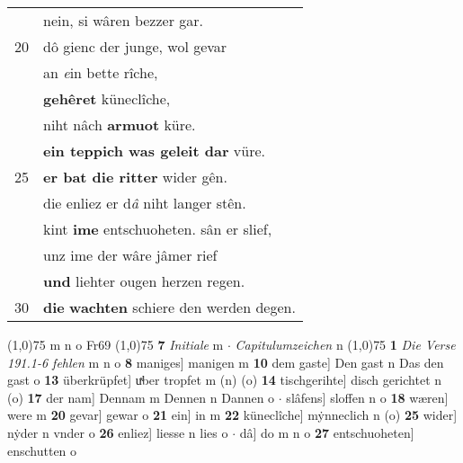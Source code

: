 \documentclass[8pt,a4paper,notitlepage]{article}
\begin{document}
\begin{table}[ht]
\begin{minipage}[t]{0.5\linewidth}
\begin{tabular}{rl}
 & nein, si wâren bezzer gar.\\ 
20 & dô gienc der junge, wol gevar\\ 
 & an \textit{e}in bette rîche,\\ 
 & \textbf{gehêret} küneclîche,\\ 
 & niht nâch \textbf{armuot} küre.\\ 
 & \textbf{ein teppich was geleit dar} vüre.\\ 
25 & \textbf{er bat die ritter} wider gên.\\ 
 & die enliez er d\textit{â} niht langer stên.\\ 
 & kint \textbf{ime} entschuoheten. sân er slief,\\ 
 & unz ime der wâre jâmer rief\\ 
 & \textbf{und} liehter ougen herzen regen.\\ 
30 & \textbf{die} \textbf{wachten} schiere den werden degen.\\ 
\end{tabular}
\scriptsize
\line(1,0){75} \newline
m n o Fr69 \newline
\line(1,0){75} \newline
\textbf{7} \textit{Initiale} m   $\cdot$ \textit{Capitulumzeichen} n  \newline
\line(1,0){75} \newline
\textbf{1} \textit{Die Verse 191.1-6 fehlen} m n o  \textbf{8} maniges] manigen m \textbf{10} dem gaste] Den gast n Das den gast o \textbf{13} überkrüpfet] uͯber tropfet m (n) (o) \textbf{14} tischgerihte] disch gerichtet n (o) \textbf{17} der nam] Dennam m Dennen n Dannen o  $\cdot$ slâfens] sloffen n o \textbf{18} wæren] were m \textbf{20} gevar] gewar o \textbf{21} ein] in m \textbf{22} küneclîche] mẏnneclich n (o) \textbf{25} wider] nẏder n vnder o \textbf{26} enliez] liesse n lies o  $\cdot$ dâ] do m n o \textbf{27} entschuoheten] enschutten o \newline
\end{minipage}
\end{table}
\newpage
\end{document}
